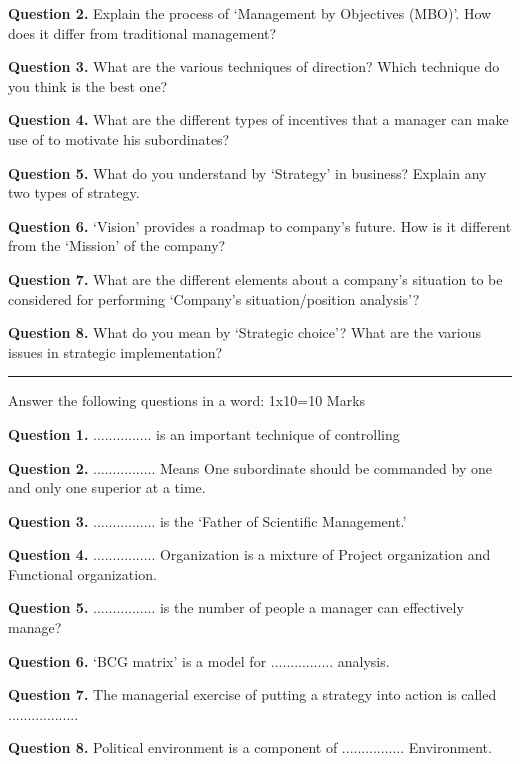 \documentclass[11pt,a4paper]{article}
\begin{document}
\medskip\noindent\textbf{Question 2.} Explain the process of ‘Management by Objectives (MBO)’. How does it differ from
traditional management?

\medskip\noindent\textbf{Question 3.} What are the various techniques of direction? Which technique do you think is the best
one?

\medskip\noindent\textbf{Question 4.} What are the different types of incentives that a manager can make use of to motivate
his subordinates?

\medskip\noindent\textbf{Question 5.} What do you understand by ‘Strategy’ in business? Explain any two types of strategy.

\medskip\noindent\textbf{Question 6.} ‘Vision’ provides a roadmap to company’s future. How is it different from the
‘Mission’ of the company?

\medskip\noindent\textbf{Question 7.} What are the different elements about a company's situation to be considered for
performing ‘Company's situation/position analysis’?

\medskip\noindent\textbf{Question 8.} What do you mean by ‘Strategic choice’? What are the various issues in strategic
implementation?

\bigskip{}
\rule{\linewidth}{0.4pt}\smallskip

Answer the following questions in a word: 1x10=10 Marks

\medskip\noindent\textbf{Question 1.} ............... is an important technique of controlling

\medskip\noindent\textbf{Question 2.} ................ Means One subordinate should be commanded by one and only one superior at a
time.

\medskip\noindent\textbf{Question 3.} ................ is the ‘Father of Scientific Management.’

\medskip\noindent\textbf{Question 4.} ................ Organization is a mixture of Project organization and Functional organization.

\medskip\noindent\textbf{Question 5.} ................ is the number of people a manager can effectively manage?

\medskip\noindent\textbf{Question 6.} ‘BCG matrix’ is a model for ................ analysis.

\medskip\noindent\textbf{Question 7.} The managerial exercise of putting a strategy into action is called ..................

\medskip\noindent\textbf{Question 8.} Political environment is a component of ................ Environment.
\end{document}
